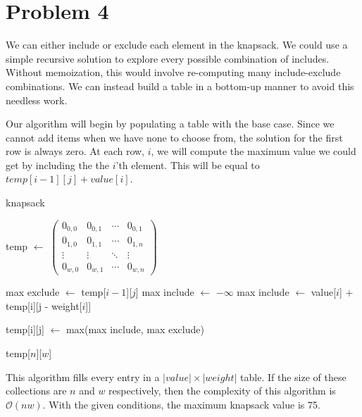 \documentclass{article}
\newenvironment{problem}[1]{
  \nobreak\section*{Problem #1}
}{}
\newcommand*{\Let}[2]{\State #1 $\gets$ #2}
\newcommand*{\bigO}[1]{\ensuremath{\mathcal{O}\left(#1\right)}}
\begin{document}
  \begin{problem}{4}
    We can either include or exclude each element in the knapsack.
    We could use a simple recursive solution to explore every 
    possible combination of includes.  Without memoization, this
    would involve re-computing many include-exclude combinations.  We
    can instead build a table in a bottom-up manner to avoid this
    needless work.

    Our algorithm will begin by populating a table with the base
    case.  Since we cannot add items when we have none to choose
    from, the solution for the first row is always zero.  At each
    row, $i$, we will compute the maximum value we could get by
    including the the $i$'th element.  This will be equal to 
    $temp[i-1][j] + value[i]$.

    \begin{algorithm}
      \caption{knapsack}
      \begin{algorithmic}[1]
          \Let{temp}{$\begin{pmatrix}
            0_{0,0} & 0_{0,1} & \cdots & 0_{0,1} \\
            0_{1,0} & 0_{1,1} & \cdots & 0_{1,n} \\
            \vdots  & \vdots  & \ddots & \vdots  \\
            0_{w,0} & 0_{w,1} & \cdots & 0_{w,n} 
            \end{pmatrix}$}

              \Let{max exclude}{temp[$i - 1$][$j$]}
              \Let{max include}{$-\infty$}
               
                \Let{max include}{value[$i$] $+$ temp[i][j - weight[$i$]]}
              \EndIf

              \Let{temp[i][j]}{max(max include, max exclude)}
            \EndFor
          \EndFor

          \State \Return temp[$n$][$w$]
        \EndFunction
      \end{algorithmic}
    \end{algorithm}

    This algorithm fills every entry in a $|value| \times |weight|$ 
    table.  If the size of these collections are $n$ and $w$ 
    respectively, then the complexity of this algorithm is \bigO{nw}.
    With the given conditions, the maximum knapsack value is 75.
  \end{problem}
\end{document}
